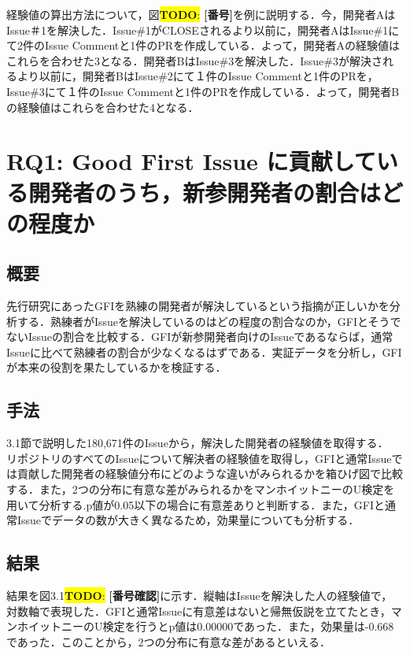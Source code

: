 \documentclass[11pt]{jreport}
\newcommand{\RQOne}{Good First Issue に貢献している開発者のうち，新参開発者の割合はどの程度か}
\newcommand{\NIssue}{180,671}
\newcommand{\todo}[1]{\colorbox{yellow}{{\bf TODO}:}{\color{red} {\textbf{[#1]}}}}
\begin{document}
経験値の算出方法について，図\todo{番号}を例に説明する．今，開発者AはIssue＃1を解決した．Issue\#1がCLOSEされるより以前に，開発者AはIssue\#1にて2件のIssue Commentと1件のPRを作成している．よって，開発者Aの経験値はこれらを合わせた3となる．開発者BはIssue\#3を解決した．Issue\#3が解決されるより以前に，開発者BはIssue\#2にて１件のIssue Commentと1件のPRを，Issue\#3にて１件のIssue Commentと1件のPRを作成している．よって，開発者Bの経験値はこれらを合わせた4となる．

\section{RQ1: \RQOne}

\subsection{概要}

先行研究\cite{GFI}にあったGFIを熟練の開発者が解決しているという指摘が正しいかを分析する．熟練者がIssueを解決しているのはどの程度の割合なのか，GFIとそうでないIssueの割合を比較する．GFIが新参開発者向けのIssueであるならば，通常Issueに比べて熟練者の割合が少なくなるはずである．実証データを分析し，GFIが本来の役割を果たしているかを検証する．

\subsection{手法}
3.1節で説明した\NIssue 件のIssueから，解決した開発者の経験値を取得する．
リポジトリのすべてのIssueについて解決者の経験値を取得し，GFIと通常Issueでは貢献した開発者の経験値分布にどのような違いがみられるかを箱ひげ図で比較する．また，2つの分布に有意な差がみられるかをマンホイットニーのU検定を用いて分析する.p値が0.05以下の場合に有意差ありと判断する．また，GFIと通常Issueでデータの数が大きく異なるため，効果量についても分析する．

\subsection{結果}

結果を図3.1\todo{番号確認}に示す．縦軸はIssueを解決した人の経験値で，対数軸で表現した．GFIと通常Issueに有意差はないと帰無仮説を立てたとき，マンホイットニーのU検定を行うとp値は0.00000であった．また，効果量は-0.668であった．このことから，2つの分布に有意な差があるといえる．
\end{document}

